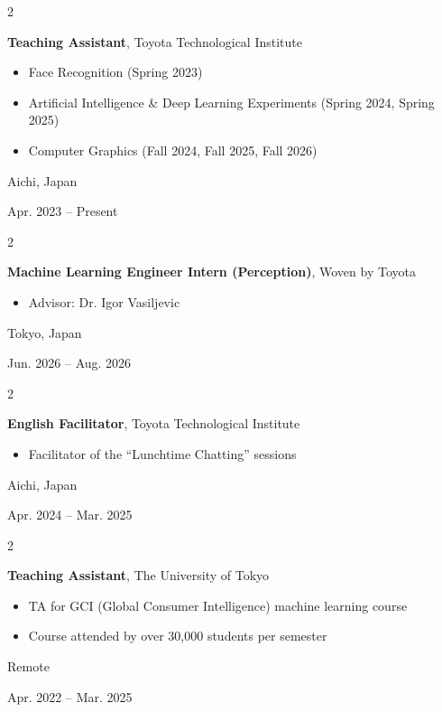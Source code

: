 \documentclass[10pt, letterpaper]{article}
\newenvironment{highlights}{
    \begin{itemize}[
        topsep=0.10 cm,
        parsep=0.10 cm,
        partopsep=0pt,
        itemsep=0pt,
        leftmargin=0.4 cm + 10pt
    ]
}{
    \end{itemize}
} %
\newenvironment{twocolentry}[2][]{
    \onecolentry
    \def\secondColumn{#2}
    \setcolumnwidth{\fill, 4.5 cm}
    \begin{paracol}{2}
}{
    \switchcolumn \raggedleft \secondColumn
    \end{paracol}
    \endonecolentry
} %
\begin{document}
        \vspace{0.2 cm}

        \begin{twocolentry}{
            Aichi, Japan

        Apr. 2023 -- Present
        }
            \textbf{Teaching Assistant}, Toyota Technological Institute
            \begin{highlights}
                \item Face Recognition (Spring 2023)
                \item Artificial Intelligence \& Deep Learning Experiments (Spring 2024, Spring 2025)
                \item Computer Graphics (Fall 2024, Fall 2025, Fall 2026)
            \end{highlights}
        \end{twocolentry}

        \vspace{0.2 cm}

        \begin{twocolentry}{
            Tokyo, Japan

            Jun. 2026 -- Aug. 2026
        }
            \textbf{Machine Learning Engineer Intern (Perception)}, Woven by Toyota
            \begin{highlights}
                \item Advisor: Dr. Igor Vasiljevic
            \end{highlights}
        \end{twocolentry}

        \vspace{0.2 cm}

        \begin{twocolentry}{
            Aichi, Japan

        Apr. 2024 --  Mar. 2025
        }
            \textbf{English Facilitator}, Toyota Technological Institute
            \begin{highlights}
                \item Facilitator of the ``Lunchtime Chatting'' sessions
            \end{highlights}
        \end{twocolentry}
        
        \vspace{0.2 cm}

        \begin{twocolentry}{
            Remote

        Apr. 2022 -- Mar. 2025
        }
            \textbf{Teaching Assistant}, The University of Tokyo
            \begin{highlights}
                \item TA for GCI (Global Consumer Intelligence) machine learning course
                \item Course attended by over 30,000 students per semester
            \end{highlights}
        \end{twocolentry}
\end{document}
